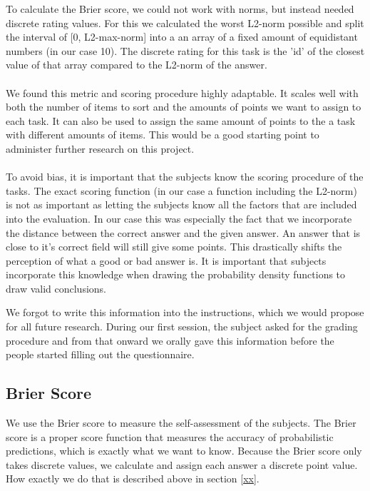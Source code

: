 \documentclass[../main/main.tex]{subfiles}
\begin{document}
	To calculate the Brier score, we could not work with norms, but instead needed discrete rating values. For this we calculated the worst L2-norm possible and split the interval of [0, L2-max-norm] into a an array of a fixed amount of equidistant numbers (in our case 10). The discrete rating for this task is the 'id' of the closest value of that array compared to the L2-norm of the answer.
	\\\\
	We found this metric and scoring procedure highly adaptable. It scales well with both the number of items to sort and the amounts of points we want to assign to each task. It can also be used to assign the same amount of points to the a task with different amounts of items. This would be a good starting point to administer further research on this project.
	\\\\
	To avoid bias, it is important that the subjects know the scoring procedure of the tasks. The exact scoring function (in our case a function including the L2-norm) is not as important as letting the subjects know all the factors that are included into the evaluation. In our case this was especially the fact that we incorporate the distance between the correct answer and the given answer. An answer that is close to it's correct field will still give some points. This drastically shifts the perception of what a good or bad answer is. It is important that subjects incorporate this knowledge when drawing the probability density functions to draw valid conclusions.
	
	We forgot to write this information into the instructions, which we would propose for all future research. During our first session, the subject asked for the grading procedure and from that onward we orally gave this information before the people started filling out the questionnaire.
	
	\subsection{Brier Score}
	\label{sec:brier_score}
	
	We use the Brier score to measure the self-assessment of the subjects. The Brier score is a proper score function that measures the accuracy of probabilistic predictions, which is exactly what we want to know. Because the Brier score only takes discrete values, we calculate and assign each answer a discrete point value. How exactly we do that is described above in section \ref{xx}. 
	
\end{document}
